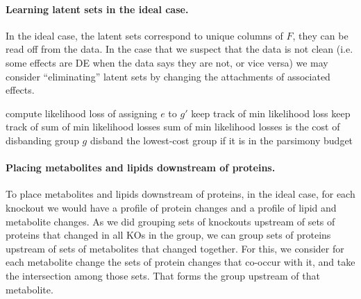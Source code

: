 \documentclass{article}
\begin{document}
\paragraph{Learning latent sets in the ideal case.}
In the ideal case, the latent sets correspond to unique columns of $F$, they can be read off from the data.
In the case that we suspect that the data is not clean (i.e. some effects are DE when the data says they are not, or vice versa) we may consider ``eliminating'' latent sets by changing the attachments of associated effects.
\begin{algorithmic}
\REPEAT
        \STATE compute likelihood loss of assigning $e$ to $g'$
        \STATE keep track of min likelihood loss
      \ENDFOR
      \STATE keep track of sum of min likelihood losses
    \ENDFOR
    \STATE sum of min likelihood losses is the cost of disbanding group $g$
  \ENDFOR
  \STATE disband the lowest-cost group if it is in the parsimony budget
\end{algorithmic}

\paragraph{Placing metabolites and lipids downstream of proteins.}
To place metabolites and lipids downstream of proteins, in the ideal case, for each knockout we would have a profile of protein changes and a profile of lipid and metabolite changes.
As we did grouping sets of knockouts upstream of sets of proteins that changed in all KOs in the group, we can group sets of proteins upstream of sets of metabolites that changed together.
For this, we consider for each metabolite change the sets of protein changes that co-occur with it, and take the intersection among those sets. That forms the group upstream of that metabolite.



\printbibliography
\end{document}
